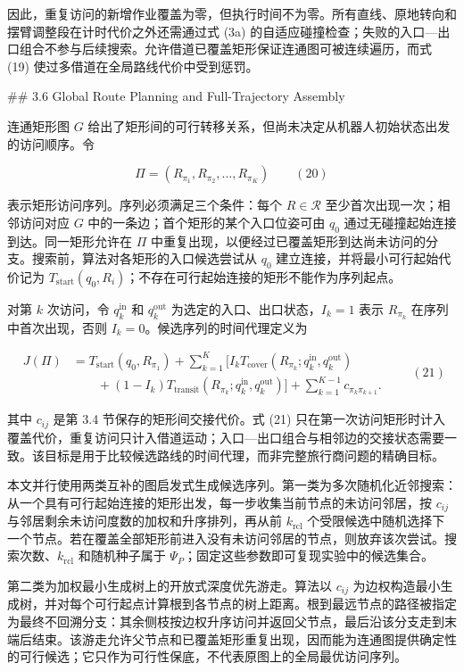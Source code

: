   

因此，重复访问的新增作业覆盖为零，但执行时间不为零。所有直线、原地转向和摆臂调整段在计时代价之外还需通过式 (3a) 的自适应碰撞检查；失败的入口—出口组合不参与后续搜索。允许借道已覆盖矩形保证连通图可被连续遍历，而式 (19) 使过多借道在全局路线代价中受到惩罚。

  

## 3.6 Global Route Planning and Full-Trajectory Assembly

连通矩形图 $G$ 给出了矩形间的可行转移关系，但尚未决定从机器人初始状态出发的访问顺序。令

$$
\Pi=(R_{\pi_1},R_{\pi_2},\ldots,R_{\pi_K})
\qquad(20)
$$

表示矩形访问序列。序列必须满足三个条件：每个 $R\in\mathcal R$ 至少首次出现一次；相邻访问对应 $G$ 中的一条边；首个矩形的某个入口位姿可由 $q_0$ 通过无碰撞起始连接到达。同一矩形允许在 $\Pi$ 中重复出现，以便经过已覆盖矩形到达尚未访问的分支。搜索前，算法对各矩形的入口候选尝试从 $q_0$ 建立连接，并将最小可行起始代价记为 $T_{\mathrm{start}}(q_0,R_i)$；不存在可行起始连接的矩形不能作为序列起点。

对第 $k$ 次访问，令 $q_k^{\mathrm{in}}$ 和 $q_k^{\mathrm{out}}$ 为选定的入口、出口状态，$I_k=1$ 表示 $R_{\pi_k}$ 在序列中首次出现，否则 $I_k=0$。候选序列的时间代理定义为

$$
\begin{aligned}
J(\Pi)&=T_{\mathrm{start}}(q_0,R_{\pi_1})
+\sum_{k=1}^{K}\bigl[
I_kT_{\mathrm{cover}}(R_{\pi_k};q_k^{\mathrm{in}},q_k^{\mathrm{out}})\\
&\qquad +(1-I_k)T_{\mathrm{transit}}(R_{\pi_k};q_k^{\mathrm{in}},q_k^{\mathrm{out}})
\bigr]
+\sum_{k=1}^{K-1}c_{\pi_k\pi_{k+1}}.
\end{aligned}
\qquad(21)
$$

其中 $c_{ij}$ 是第 3.4 节保存的矩形间交接代价。式 (21) 只在第一次访问矩形时计入覆盖代价，重复访问只计入借道运动；入口—出口组合与相邻边的交接状态需要一致。该目标是用于比较候选路线的时间代理，而非完整旅行商问题的精确目标。

本文并行使用两类互补的图启发式生成候选序列。第一类为多次随机化近邻搜索：从一个具有可行起始连接的矩形出发，每一步收集当前节点的未访问邻居，按 $c_{ij}$ 与邻居剩余未访问度数的加权和升序排列，再从前 $k_{\mathrm{rcl}}$ 个受限候选中随机选择下一个节点。若在覆盖全部矩形前进入没有未访问邻居的节点，则放弃该次尝试。搜索次数、$k_{\mathrm{rcl}}$ 和随机种子属于 $\Psi_P$；固定这些参数即可复现实验中的候选集合。

第二类为加权最小生成树上的开放式深度优先游走。算法以 $c_{ij}$ 为边权构造最小生成树，并对每个可行起点计算根到各节点的树上距离。根到最远节点的路径被指定为最终不回溯分支：其余侧枝按边权升序访问并返回父节点，最后沿该分支走到末端后结束。该游走允许父节点和已覆盖矩形重复出现，因而能为连通图提供确定性的可行候选；它只作为可行性保底，不代表原图上的全局最优访问序列。

